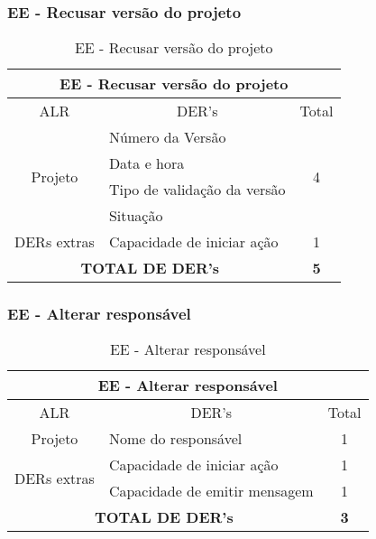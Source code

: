    
\vfill
\pagebreak
   \subsubsection{EE - Recusar versão do projeto}
   
      \begin{table}[!h]
      \centering
      \caption{EE - Recusar versão do projeto}
      \label{ee_resusar_versao_projeto}
      \begin{tabular}{|c|l|c|}
      \hline
      \multicolumn{3}{|c|}{EE - Recusar versão do projeto}                        \\ \hline
      ALR                      & \multicolumn{1}{c|}{DER's}  & Total              \\ \hline
      \multirow{4}{*}{Projeto} & Número da Versão            & \multirow{4}{*}{4} \\ \cline{2-2}
			      & Data e hora                 &                    \\ \cline{2-2}
			      & Tipo de validação da versão &                    \\ \cline{2-2}
			      & Situação                    &                    \\ \hline
      DERs extras              & Capacidade de iniciar ação  & 1                  \\ \hline
      \multicolumn{2}{|c|}{\textbf{TOTAL DE DER's}}          & \textbf{5}         \\ \hline
      \end{tabular}
      \end{table}
      
   \subsubsection{EE - Alterar responsável}
      
      \begin{table}[!h]
      \centering
      \caption{EE - Alterar responsável}
      \label{ee_alterar_responsavel}
      \begin{tabular}{|c|l|c|}
      \hline
      \multicolumn{3}{|c|}{EE - Alterar responsável}                              \\ \hline
      ALR                          & \multicolumn{1}{c|}{DER's}    & Total        \\ \hline
      Projeto                      & Nome do responsável           & 1            \\ \hline
      \multirow{2}{*}{DERs extras} & Capacidade de iniciar ação    & 1            \\ \cline{2-3} 
				  & Capacidade de emitir mensagem & 1            \\ \hline
       \multicolumn{2}{|c|}{\textbf{TOTAL DE DER's}}          & \textbf{3}         \\ \hline
      \end{tabular}
      \end{table}
      
